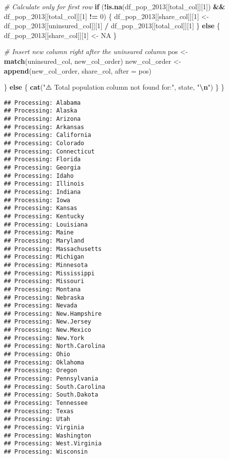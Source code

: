 \documentclass[
]{article}
\newenvironment{Shaded}{\begin{snugshade}}{\end{snugshade}}
\newcommand{\AttributeTok}[1]{\textcolor[rgb]{0.13,0.29,0.53}{#1}}
\newcommand{\CommentTok}[1]{\textcolor[rgb]{0.56,0.35,0.01}{\textit{#1}}}
\newcommand{\ConstantTok}[1]{\textcolor[rgb]{0.56,0.35,0.01}{#1}}
\newcommand{\ControlFlowTok}[1]{\textcolor[rgb]{0.13,0.29,0.53}{\textbf{#1}}}
\newcommand{\DecValTok}[1]{\textcolor[rgb]{0.00,0.00,0.81}{#1}}
\newcommand{\FunctionTok}[1]{\textcolor[rgb]{0.13,0.29,0.53}{\textbf{#1}}}
\newcommand{\NormalTok}[1]{#1}
\newcommand{\OtherTok}[1]{\textcolor[rgb]{0.56,0.35,0.01}{#1}}
\newcommand{\SpecialCharTok}[1]{\textcolor[rgb]{0.81,0.36,0.00}{\textbf{#1}}}
\newcommand{\StringTok}[1]{\textcolor[rgb]{0.31,0.60,0.02}{#1}}
\begin{document}
\begin{Shaded}
\begin{Highlighting}[]
    \CommentTok{\# Calculate only for first row}
    \ControlFlowTok{if}\NormalTok{ (}\SpecialCharTok{!}\FunctionTok{is.na}\NormalTok{(df\_pop\_2013[[total\_col]][}\DecValTok{1}\NormalTok{]) }\SpecialCharTok{\&\&}\NormalTok{ df\_pop\_2013[[total\_col]][}\DecValTok{1}\NormalTok{] }\SpecialCharTok{!=} \DecValTok{0}\NormalTok{) \{}
\NormalTok{      df\_pop\_2013[[share\_col]][}\DecValTok{1}\NormalTok{] }\OtherTok{\textless{}{-}}\NormalTok{ df\_pop\_2013[[uninsured\_col]][}\DecValTok{1}\NormalTok{] }\SpecialCharTok{/}\NormalTok{ df\_pop\_2013[[total\_col]][}\DecValTok{1}\NormalTok{]}
\NormalTok{    \} }\ControlFlowTok{else}\NormalTok{ \{}
\NormalTok{      df\_pop\_2013[[share\_col]][}\DecValTok{1}\NormalTok{] }\OtherTok{\textless{}{-}} \ConstantTok{NA}
\NormalTok{    \}}
    
    \CommentTok{\# Insert new column right after the uninsured column}
\NormalTok{    pos }\OtherTok{\textless{}{-}} \FunctionTok{match}\NormalTok{(uninsured\_col, new\_col\_order)}
\NormalTok{    new\_col\_order }\OtherTok{\textless{}{-}} \FunctionTok{append}\NormalTok{(new\_col\_order, share\_col, }\AttributeTok{after =}\NormalTok{ pos)}
    
\NormalTok{  \} }\ControlFlowTok{else}\NormalTok{ \{}
    \FunctionTok{cat}\NormalTok{(}\StringTok{"⚠️ Total population column not found for:"}\NormalTok{, state, }\StringTok{"}\SpecialCharTok{\textbackslash{}n}\StringTok{"}\NormalTok{)}
\NormalTok{  \}}
\NormalTok{\}}
\end{Highlighting}
\end{Shaded}

\begin{verbatim}
## Processing: Alabama 
## Processing: Alaska 
## Processing: Arizona 
## Processing: Arkansas 
## Processing: California 
## Processing: Colorado 
## Processing: Connecticut 
## Processing: Florida 
## Processing: Georgia 
## Processing: Idaho 
## Processing: Illinois 
## Processing: Indiana 
## Processing: Iowa 
## Processing: Kansas 
## Processing: Kentucky 
## Processing: Louisiana 
## Processing: Maine 
## Processing: Maryland 
## Processing: Massachusetts 
## Processing: Michigan 
## Processing: Minnesota 
## Processing: Mississippi 
## Processing: Missouri 
## Processing: Montana 
## Processing: Nebraska 
## Processing: Nevada 
## Processing: New.Hampshire 
## Processing: New.Jersey 
## Processing: New.Mexico 
## Processing: New.York 
## Processing: North.Carolina 
## Processing: Ohio 
## Processing: Oklahoma 
## Processing: Oregon 
## Processing: Pennsylvania 
## Processing: South.Carolina 
## Processing: South.Dakota 
## Processing: Tennessee 
## Processing: Texas 
## Processing: Utah 
## Processing: Virginia 
## Processing: Washington 
## Processing: West.Virginia 
## Processing: Wisconsin
\end{verbatim}
\end{document}
